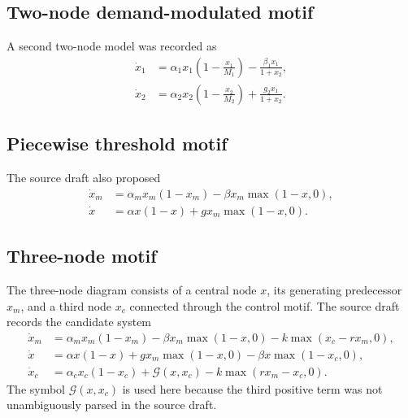 \documentclass[11pt, reqno]{amsart}
\theoremstyle{definition}
\theoremstyle{remark}
\begin{document}

\subsection{Two-node demand-modulated motif}

A second two-node model was recorded as
\begin{equation}
\label{eq:two-node-demand}
\begin{aligned}
    \dot x_1
    &=
    \alpha_1x_1\left(1-\frac{x_1}{M_1}\right)
    -\frac{\beta_1x_1}{1+x_2},\\
    \dot x_2
    &=
    \alpha_2x_2\left(1-\frac{x_2}{M_2}\right)
    +\frac{g_2x_1}{1+x_2}.
\end{aligned}
\end{equation}


\subsection{Piecewise threshold motif}

The source draft also proposed
\begin{equation}
\label{eq:two-node-threshold}
\begin{aligned}
    \dot x_m
    &=
    \alpha_mx_m(1-x_m)
    -\beta x_m\max(1-x,0),\\
    \dot x
    &=
    \alpha x(1-x)
    +g x_m\max(1-x,0).
\end{aligned}
\end{equation}


\subsection{Three-node motif}

The three-node diagram consists of a central node $x$, its generating
predecessor $x_m$, and a third node $x_c$ connected through the control motif.
The source draft records the candidate system
\begin{equation}
\label{eq:three-node-source}
\begin{aligned}
    \dot x_m
    &=
    \alpha_mx_m(1-x_m)
    -\beta x_m\max(1-x,0)
    -k\max(x_c-rx_m,0),\\
    \dot x
    &=
    \alpha x(1-x)
    +g x_m\max(1-x,0)
    -\beta x\max(1-x_c,0),\\
    \dot x_c
    &=
    \alpha_cx_c(1-x_c)
    +\mathcal G(x,x_c)
    -k\max(rx_m-x_c,0).
\end{aligned}
\end{equation}
The symbol $\mathcal G(x,x_c)$ is used here because the third positive term was
not unambiguously parsed in the source draft.
\end{document}
